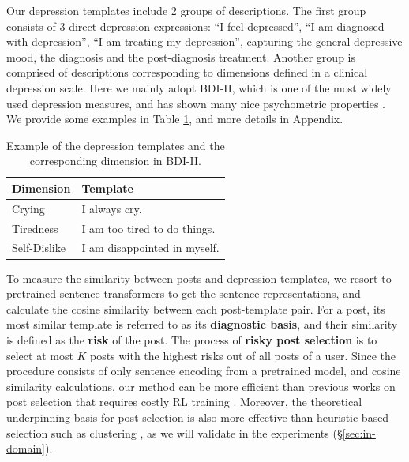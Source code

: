 Our depression templates include 2 groups of descriptions. The first group consists of 3 direct depression expressions: ``I feel depressed'', ``I am diagnosed with depression'', ``I am treating my depression'', capturing the general depressive mood, the diagnosis and the post-diagnosis treatment. Another group is comprised of descriptions corresponding to dimensions defined in a clinical depression scale. Here we mainly adopt BDI-II, which is one of the most widely used depression measures, and has shown many nice psychometric properties \citep{beck1996beck}. We provide some examples in Table \ref{tab:template_example}, and more details in Appendix.

\begin{table}[h]
    \centering
    \begin{tabular}{l|l}
        \hline
        Dimension & Template \\
        \hline
        Crying & I always cry. \\
        Tiredness  & I am too tired to do things. \\
        Self-Dislike & I am disappointed in myself. \\
        \hline
    \end{tabular}
    \caption{Example of the depression templates and the corresponding dimension in BDI-II.}
    \label{tab:template_example}
\end{table}

To measure the similarity between posts and depression templates, we resort to pretrained sentence-transformers \citep{reimers-2019-sentence-bert} to get the sentence representations, and calculate the cosine similarity between each post-template pair. For a post, its most similar template is referred to as its \textbf{diagnostic basis}, and their similarity is defined as the \textbf{risk} of the post. The process of \textbf{risky post selection} is to select at most $K$ posts with the highest risks out of all posts of a user. Since the procedure consists of only sentence encoding from a pretrained model, and cosine similarity calculations, our method can be more efficient than previous works on post selection that requires costly RL training \citep{gui2019cooperative}. Moreover, the theoretical underpinning basis for post selection is also more effective than heuristic-based selection such as clustering \citep{zogan2021depressionnet}, as we will validate in the experiments (\S \ref{sec:in-domain}).



